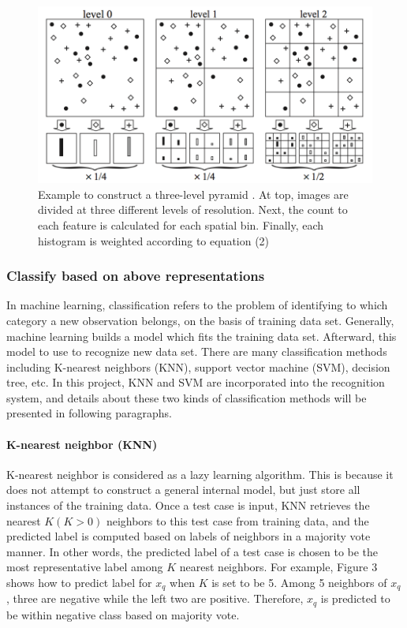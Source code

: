 \begin{figure}[!ht]
\centering
  \includegraphics[width=1\textwidth]{./SpatialPyramidMatch.png}
\caption{Example to construct a three-level pyramid \cite{lazebnik2006beyond}. At top, images are divided at three different levels of resolution. Next, the count to each feature is calculated for each spatial bin. Finally, each histogram is weighted according to equation (2)}
\end{figure}

\subsubsection{Classify based on above representations}
In machine learning, classification refers to the problem of identifying to which category a new observation belongs, on the basis of training data set. Generally, machine learning builds a model which fits the training data set. Afterward, this model to use to recognize new data set. There are many classification methods including K-nearest neighbors (KNN), support vector machine (SVM), decision tree, etc. In this project, KNN and SVM are incorporated into the recognition system, and details about these two kinds of classification methods will be presented in following paragraphs. 

  \paragraph{K-nearest neighbor (KNN)} 
  K-nearest neighbor is considered as a lazy learning algorithm. This is because it does not attempt to construct a general internal model, but just store all instances of the training data. Once a test case is input, KNN retrieves the nearest $K (K>0)$ neighbors to this test case from training data, and the predicted label is computed based on labels of neighbors in a majority vote manner. In other words, the predicted label of a test case is chosen to be the most representative label among $K$ nearest neighbors. For example, Figure 3 shows how to predict label for $x_{q}$ when $K$ is set to be 5. Among 5 neighbors of $x_{q}$, three are negative while the left two are positive. Therefore, $x_{q}$ is predicted to be within negative class based on majority vote. 

